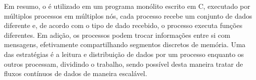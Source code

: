 Em resumo, o \mpi é utilizado em um programa monólito escrito em C, executado
por múltiplos processos em múltiplos nós, cada processo recebe um conjunto de
dados diferente e, de acordo com o tipo de dado recebido, o processo executa
funções diferentes.
Em adição, os processos podem trocar informações entre si com mensagens,
efetivamente compartilhando segmentos discretos de memória.
Uma das estratégias é a leitura e distribuição de dados por um processo enquanto
os outros processam, dividindo o trabalho, sendo possível desta maneira tratar
de fluxos contínuos de dados de maneira escalável.

